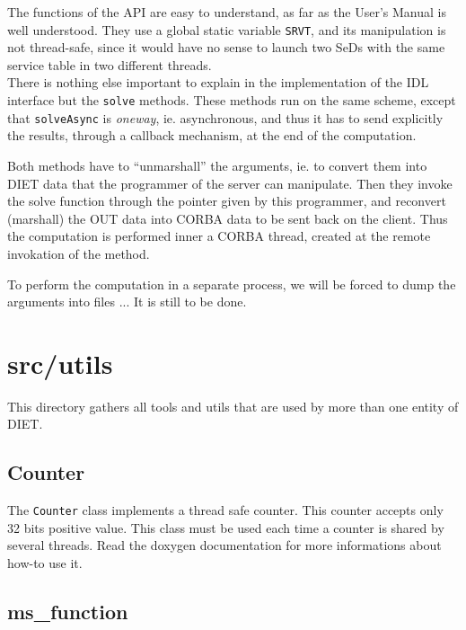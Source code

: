 The functions of the API are easy to understand, as far as the User's Manual is
well understood. They use a global static variable \texttt{SRVT}, and its
manipulation is not thread-safe, since it would have no sense to launch two SeDs
with the same service table in two different threads.
\\

There is nothing else important to explain in the implementation of the IDL
interface but the \texttt{solve} methods. These methods run on the same
scheme, except that \texttt{solveAsync} is \textit{oneway}, ie. asynchronous,
and thus it has to send explicitly the results, through a callback mechanism, at
the end of the computation.


Both methods have to ``unmarshall'' the arguments, ie. to convert them into DIET
data that the programmer of the server can manipulate. Then they invoke the
solve function through the pointer given by this programmer, and reconvert
(marshall) the OUT data into CORBA data to be sent back on the client. Thus the
computation is performed inner a CORBA thread, created at the remote invokation
of the method.

To perform the computation in a separate process, we will be forced to dump the
arguments into files ... It is still to be done.


\section{\textsf{src/utils}}
\label{s:utils}

This directory gathers all tools and utils that are used by more than one
entity of DIET.


\subsection{\textsf{Counter}}

The \texttt{Counter} class implements a thread safe counter. This counter
accepts only 32 bits positive value. This class must be used each time a
counter is shared by several threads. Read the doxygen documentation for more
informations about how-to use it.

\subsection{\textsf{ms\_function}}

